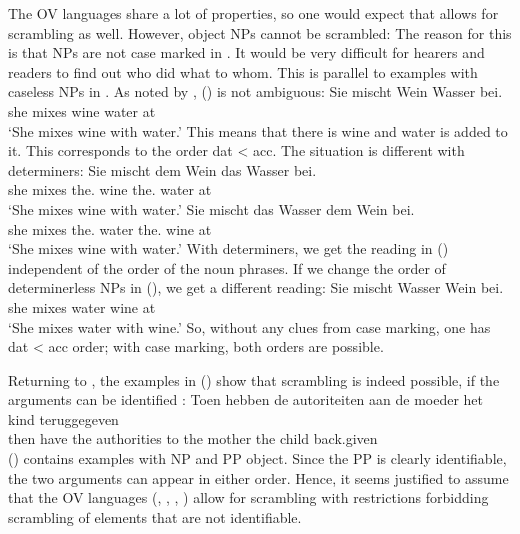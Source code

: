The OV languages share a lot of properties, so one would expect that  allows for scrambling as
well. However, object NPs cannot be scrambled:
\z
The reason for this is that NPs are not case marked in . It would be very difficult for hearers
and readers to find out who did what to whom. This is parallel to examples with caseless NPs in
. As noted by \citet[]{Wegener85b}, () is not ambiguous:
\ea
\label{ex-sie-mischt-dem-wein-wasser-bei}
\gll Sie mischt Wein Wasser bei.\\
     she mixes  wine water  at\\\german
\glt `She mixes wine with water.'
\z
This means that there is wine and water is added to it. This corresponds to the order dat < acc.
The situation is different with determiners:
\eal
\ex 
\gll Sie mischt dem Wein das Wasser bei.\\
     she mixes  the.\DAT{} wine the.\ACC{} water at\\\german
\glt `She mixes wine with water.'
\ex 
\gll Sie mischt das        Wasser dem        Wein bei.\\
     she mixes  the.\ACC{} water  the.\DAT{} wine at\\
\glt `She mixes wine with water.'
\zl
With determiners, we get the reading in () independent of the order of the noun phrases. If
we change the order of determinerless NPs in (), we get a different reading:
\ea
\gll Sie mischt Wasser Wein bei.\\
     she mixes  water wine  at\\\german
\glt `She mixes water with wine.'
\z
So, without any clues from case marking, one has dat < acc order; with case marking, both orders are possible.

Returning to , the examples in () show that scrambling is indeed possible, if the arguments can be
identified \parencites[]{GHdRvdT1984a-ed}[, 152]{Haider2010a}:
\eal
\ex
{}
\ex 
\gll Toen hebben de  autoriteiten aan de moeder  het kind  teruggegeven\\
     then have   the authorities  to  the mother the child back.given\\
\zl
() contains examples with NP and PP object. Since the PP is clearly identifiable, the two
arguments can appear in either order. Hence, it seems justified to assume that the OV languages (,
, , ) allow for scrambling with restrictions forbidding scrambling of elements that
are not identifiable.%

